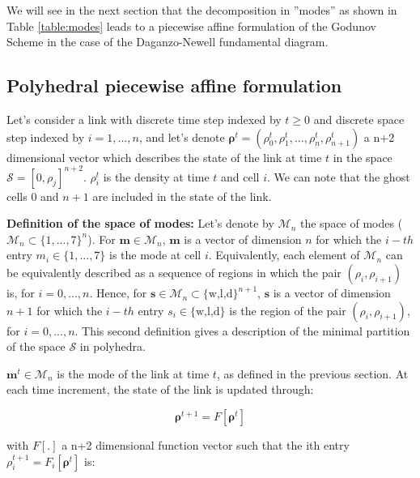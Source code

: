 \documentclass[11pt]{article}
\numberwithin{equation}{section}
\numberwithin{figure}{section}
\numberwithin{table}{section}
\begin{document}
We will see in the next section that the decomposition in ''modes'' as shown in Table \ref{table:modes} leads to a piecewise affine formulation of the Godunov Scheme in the case of the Daganzo-Newell fundamental diagram. 


\subsection{Polyhedral piecewise affine formulation}\label{sec:formulation}

Let's consider a link with discrete time step indexed by $t\geq 0$ and discrete space step indexed by $i = 1,...,n$, and let's denote $\boldsymbol\rho^{t} = (\rho^{t}_{0},\rho^{t}_{1},...,\rho^{t}_{n},\rho^{t}_{n+1})$ a n+2 dimensional vector which describes the state of the link at time $t$ in the space $\mathcal{S} = [0,\rho_{j}]^{n+2}$. $\rho^{t}_{i}$ is the density at time $t$ and cell $i$. We can note that the ghost cells $0$ and $n+1$ are included in the state of the link.

\hspace{10mm}

\noindent\textbf{Definition of the space of modes:} Let's denote by $\mathcal{M}_{n}$ the space of modes ($\mathcal{M}_{n}\subset\{1,...,7\}^{n}$). For $\boldsymbol m \in \mathcal{M}_{n}$, $\boldsymbol m$ is a vector of dimension $n$ for which the $i-th$ entry $m_{i}\in\{1,...,7\}$ is the mode at cell $i$. Equivalently, each element of $\mathcal{M}_{n}$ can be equivalently described as a sequence of regions in which the pair $(\rho_{i},\rho_{i+1})$ is, for $i=0,...,n$. Hence, for $\boldsymbol s \in \mathcal{M}_{n}\subset\{\text{w,l,d}\}^{n+1}$, $\boldsymbol s$ is a vector of dimension $n+1$ for which the $i-th$ entry $s_{i}\in\{\text{w,l,d}\}$ is the region of the pair $(\rho_{i},\rho_{i+1})$, for $i=0,...,n$. This second definition gives a description of the minimal partition of the space $\mathcal{S}$ in polyhedra.

\hspace{10mm}

$\boldsymbol m^{t}\in\mathcal{M}_{n}$ is the mode of the link at time $t$, as defined in the previous section. At each time increment, the state of the link is updated through:

\begin{equation}
\boldsymbol\rho^{t+1} = F[\boldsymbol\rho^{t}]
\label{eq:underlyingSystem1}
\end{equation}

\noindent with $F[.]$ a n+2 dimensional function vector such that the ith entry $\rho^{t+1}_{i}=F_{i}[\boldsymbol\rho^{t}]$ is:
\end{document}
